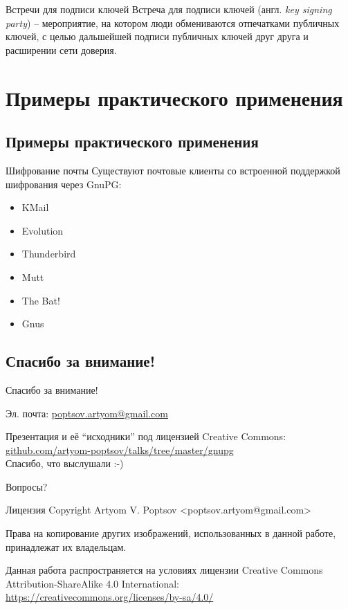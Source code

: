 \documentclass[presentation]{beamer}
\begin{document}
\begin{frame}{Встречи для подписи ключей}
  \raisebox{-.30em}{\Large\HandRight}\hspace{.25em} Встреча для
  подписи ключей (англ. \emph{key signing party}) -- мероприятие, на
  котором люди обмениваются отпечатками публичных ключей, с целью
  дальшейшей подписи публичных ключей друг друга и расширении сети
  доверия.
\end{frame}


\section{Примеры практического применения}

\subsection{Примеры практического применения}

\begin{frame}[fragile]{Шифрование почты}
  Существуют почтовые клиенты со встроенной поддержкой шифрования
  через GnuPG:
  \begin{itemize}
  \item KMail
  \item Evolution
  \item Thunderbird
  \item Mutt
  \item The Bat!
  \item Gnus
  \end{itemize}
\end{frame}




\subsection{Спасибо за внимание!}

\begin{frame}{Спасибо за внимание!}
  \large

  Эл. почта: \url{poptsov.artyom@gmail.com}

  \medskip

  Презентация и её ``исходники'' под лицензией Creative Commons:
  \url{github.com/artyom-poptsov/talks/tree/master/gnupg} \\[10pt]

  Спасибо, что выслушали  :-) \\[30pt]

  \bigskip

  \huge Вопросы?
\end{frame}

\begin{frame}{Лицензия}
  Copyright  Artyom V. Poptsov
  <poptsov.artyom@gmail.com> \newline

  Права на копирование других изображений, использованных в данной
  работе, принадлежат их владельцам. \newline

  Данная работа распространяется на условиях лицензии Creative Commons
  Attribution-ShareAlike 4.0 International:
  \url{https://creativecommons.org/licenses/by-sa/4.0/}
\end{frame}
\end{document}
